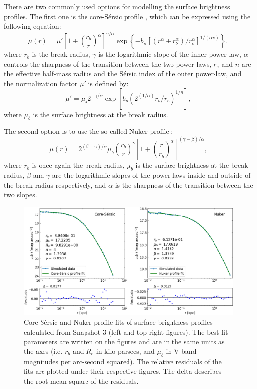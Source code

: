\documentclass[english, oneside]{HYgradu}
\begin{document}
There are two commonly used options for modelling the surface brightness profiles. The first one is the core-Sérsic profile \citep{Graham2003}, which can be expressed using the following equation:
\begin{equation}
\mu(r) = \mu' \left[ 1 + \left( \frac{r_b}{r} \right)^\alpha \right]^{\gamma / \alpha} \exp \left\lbrace -b_n \left[ \left( r^\alpha + r_b^\alpha \right) / r_e^\alpha \right]^{1/(\alpha n)} \right\rbrace, \label{eq:core-sersic}
\end{equation}
where $r_b$ is the break radius, $\gamma$ is the logarithmic slope of the inner power-law, $\alpha$ controls the sharpness of the transition between the two power-laws, $r_e$ and $n$ are the effective half-mass radius and the Sérsic index of the outer power-law, and the normalization factor $\mu'$ is defined by:
\begin{equation}
\mu' = \mu_b 2^{-\gamma/\alpha} \exp \left[ b_n \left( 2^{(1/\alpha)} r_b/r_e \right)^{1/n} \right], 
\label{eq:mu_dot}
\end{equation}
where $\mu_b$ is the surface brightness at the break radius. 

The second option is to use the so called Nuker profile \citep{Lauer1995}:
\begin{equation}
\mu(r) = 2^{(\beta - \gamma) / \alpha} \mu_b \left( \frac{r_b}{r} \right)^\gamma \left[ 1 + \left( \frac{r}{r_b} \right)^\alpha \right]^{(\gamma - \beta)/\alpha},
\label{eq:nuker}
\end{equation}
where $r_b$ is once again the break radius, $\mu_b$ is the surface brightness at the break radius, $\beta$ and $\gamma$ are the logarithmic slopes of the power-laws inside and outside of the break radius respectively, and $\alpha$ is the sharpness of the transition between the two slopes.

\begin{figure}[h]
	\centering
	\includegraphics[width=\textwidth]{core_nuker_fits.png}
	\caption{Core-Sérsic and Nuker profile fits of surface brightness profiles calculated from Snapshot 3 (left and top-right figures). The best fit parameters are written on the figures and are in the same units as the axes (i.e. $r_b$ and $R_e$ in kilo-parsecs, and $\mu_b$ in V-band magnitudes per arc-second squared). The relative residuals of the fits are plotted under their respective figures. The delta describes the root-mean-square of the residuals.}
	\label{figure:core_nuker}
\end{figure}
\end{document}
